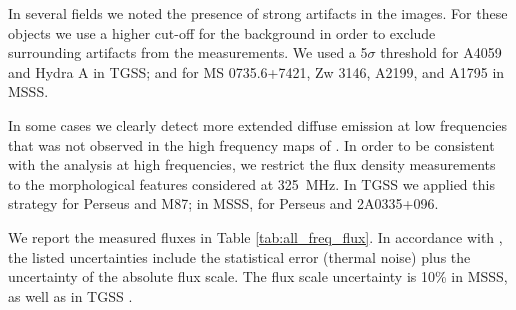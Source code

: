 \documentclass{aa}  %
\begin{document}
In several fields we noted the presence of strong artifacts in the images. For these objects we use a higher cut-off for the background in order to exclude surrounding artifacts from the measurements.
We used a 5$\sigma$ threshold for A4059 and Hydra A in TGSS; and for MS 0735.6+7421, Zw 3146, A2199, and A1795 in MSSS.%

In some cases we clearly detect more extended diffuse emission at low frequencies that was not observed in the high frequency maps of \cite{Birzan2008}. 
In order to be consistent with the analysis at high frequencies, we restrict the flux density measurements to the morphological features considered at 325~MHz. 
In TGSS we applied this strategy for Perseus and M87; in MSSS, for Perseus and 2A0335+096.

We report the measured fluxes in Table \ref{tab:all_freq_flux}.
In accordance with \cite{Birzan2008}, the listed uncertainties include the statistical error (thermal noise) plus the uncertainty of the absolute flux scale. 
The flux scale uncertainty is 10\% in MSSS, as well as in TGSS \citep{Intema2017}.
\end{document}

